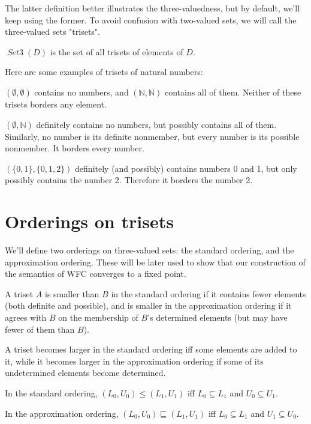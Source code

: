 \documentclass[oneside,12pt]{book}
\theoremstyle{definition}
\theoremstyle{remark}
\newcommand\var[1]{\mathop{\mathit{#1}}\nolimits}
\newcommand{\approximates}{\sqsubseteq}
\newcommand{\SetIII}{\var{Set3}}
\begin{document}
The latter definition better illustrates the three-valuedness, but by default,
we’ll keep using the former. To avoid confusion with two-valued sets, we will
call the three-valued sets "trisets".

\begin{defBox}
  $\SetIII(D)$ is the set of all trisets of elements of $D$.
\end{defBox}

\begin{exampleBox}
  Here are some examples of trisets of natural numbers:
  
  \medskip \noindent $(\emptyset, \emptyset)$ contains no numbers, and
  $(\mathbb{N}, \mathbb{N})$ contains all of them. Neither of these trisets
  borders any element.
  
  \medskip \noindent $(\emptyset, \mathbb{N})$ definitely contains no numbers,
  but possibly contains all of them. Similarly, no number is its definite nonmember,
  but every number is its possible nonmember. It borders every number.
  
  \medskip \noindent $(\{ 0, 1 \}, \{ 0, 1, 2 \})$ definitely (and possibly)
  contains numbers 0 and 1, but only possibly contains the number 2. Therefore
  it borders the number 2.
\end{exampleBox}

\section{Orderings on trisets}
We'll define two orderings on three-valued sets: the standard ordering,
and the approximation ordering. These will be later used to show that our
construction of the semantics of WFC converges to a fixed point.

A triset $A$ is smaller than $B$ in the standard ordering if it contains fewer elements
(both definite and possible), and is smaller in the approximation ordering
if it agrees with $B$ on the membership of $B$'s determined elements (but may
have fewer of them than $B$).

A triset becomes larger in the standard ordering iff some elements are added to it,
while it becomes larger in the approximation ordering if some of its undetermined
elements become determined.

\begin{defBox}
  In the standard ordering, $(L_0, U_0) \leq (L_1, U_1)$ iff $L_0 \subseteq L_1$
  and $U_0 \subseteq U_1$.
  
  \medskip \noindent
  In the approximation ordering, $(L_0, U_0) \approximates (L_1, U_1)$
  iff $L_0 \subseteq L_1$ and $U_1 \subseteq U_0$.
\end{defBox}
\end{document}
